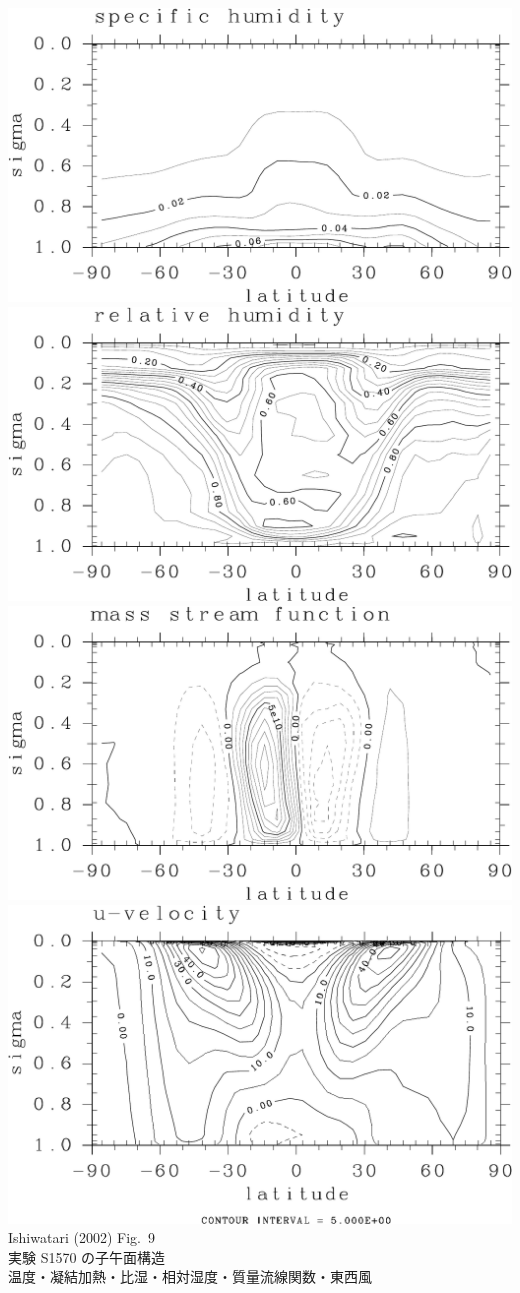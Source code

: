 \documentclass[aspectratio=149,9pt,]{beamer}
\begin{document}
\begin{frame}
\begin{columns}[T,onlytextwidth]
\begin{column}{.5\textwidth}
			\includegraphics[width=.45\textwidth]{./fig/157-q-meri.kps-crop.pdf}
			\includegraphics[width=.45\textwidth]{./fig/157-RH-meri.kps-crop.pdf}
			\includegraphics[width=.45\textwidth]{./fig/157-Strm-meri.kps-crop.pdf}
			\includegraphics[width=.45\textwidth]{./fig/157-u-meri-crop.pdf}\\
			\scriptsize Ishiwatari \etal (2002) Fig.\ 9\\
			実験 S1570 の子午面構造\\
			温度・凝結加熱・比湿・相対湿度・質量流線関数・東西風
		\end{column}
	\end{columns}
\end{frame}
\end{document}
